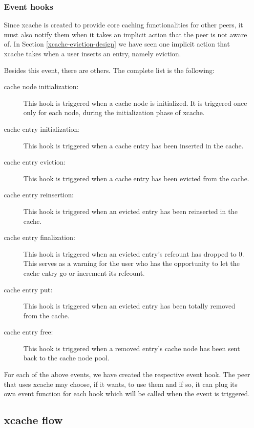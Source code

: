 \subsubsection{Event hooks}\label{sec:xcache-hooks-design}

Since xcache is created to provide core caching functionalities for other 
peers, it must also notify them when it takes an implicit action that the peer 
is not aware of. In Section \ref{xcache-eviction-design} we have seen one 
implicit action that xcache takes when a user inserts an entry, namely 
eviction. 

Besides this event, there are others. The complete list is the following:

\begin{description}
\item[cache node initialization:]
	This hook is triggered when a cache node is initialized. It is 
	triggered once only for each node, during the initialization phase of 
	xcache.
\item[cache entry initialization:]
	This hook is triggered when a cache entry has been inserted in the 
	cache.
\item[cache entry eviction:]
	This hook is triggered when a cache entry has been evicted from the 
	cache.
\item[cache entry reinsertion:]
	This hook is triggered when an evicted entry has been reinserted in the 
	cache.
\item[cache entry finalization:]
	This hook is triggered when an evicted entry's refcount has dropped to 
	0. This serves as a warning for the user who has the opportunity to let 
	the cache entry go or increment its refcount.
\item[cache entry put:]
	This hook is triggered when an evicted entry has been totally removed 
	from the cache.
\item[cache entry free:]
	This hook is triggered when a removed entry's cache node has been sent 
	back to the cache node pool.
\end{description}

For each of the above events, we have created the respective event hook. The 
peer that uses xcache may choose, if it wants, to use them and if so, it can 
plug its own event function for each hook which will be called when the event 
is triggered.

\subsection{xcache flow}\label{sec:xcache-flow-design}

